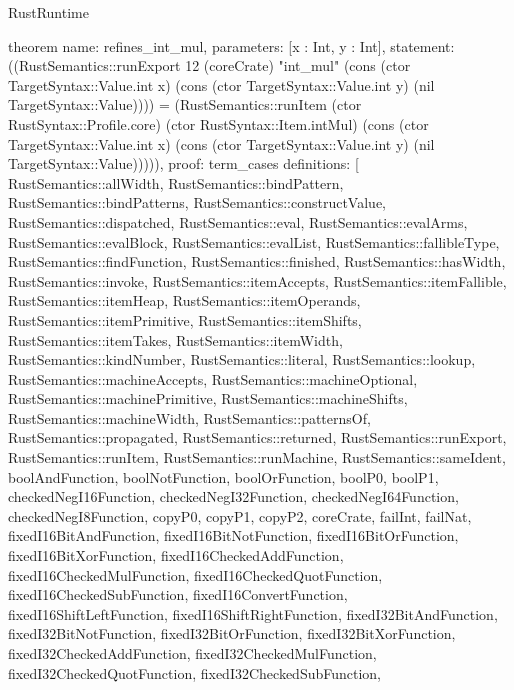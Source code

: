 \begin{lexlean}{RustRuntime}
\begin{semanticmodule}
theorem{
  name: refines_int_mul,
  parameters: [x : Int, y : Int],
  statement: ((RustSemantics::runExport 12 (coreCrate) "int_mul" (cons (ctor TargetSyntax::Value.int x) (cons (ctor TargetSyntax::Value.int y) (nil TargetSyntax::Value)))) = (RustSemantics::runItem (ctor RustSyntax::Profile.core) (ctor RustSyntax::Item.intMul) (cons (ctor TargetSyntax::Value.int x) (cons (ctor TargetSyntax::Value.int y) (nil TargetSyntax::Value))))),
  proof: term_cases{
    definitions: [
      RustSemantics::allWidth,
      RustSemantics::bindPattern,
      RustSemantics::bindPatterns,
      RustSemantics::constructValue,
      RustSemantics::dispatched,
      RustSemantics::eval,
      RustSemantics::evalArms,
      RustSemantics::evalBlock,
      RustSemantics::evalList,
      RustSemantics::fallibleType,
      RustSemantics::findFunction,
      RustSemantics::finished,
      RustSemantics::hasWidth,
      RustSemantics::invoke,
      RustSemantics::itemAccepts,
      RustSemantics::itemFallible,
      RustSemantics::itemHeap,
      RustSemantics::itemOperands,
      RustSemantics::itemPrimitive,
      RustSemantics::itemShifts,
      RustSemantics::itemTakes,
      RustSemantics::itemWidth,
      RustSemantics::kindNumber,
      RustSemantics::literal,
      RustSemantics::lookup,
      RustSemantics::machineAccepts,
      RustSemantics::machineOptional,
      RustSemantics::machinePrimitive,
      RustSemantics::machineShifts,
      RustSemantics::machineWidth,
      RustSemantics::patternsOf,
      RustSemantics::propagated,
      RustSemantics::returned,
      RustSemantics::runExport,
      RustSemantics::runItem,
      RustSemantics::runMachine,
      RustSemantics::sameIdent,
      boolAndFunction,
      boolNotFunction,
      boolOrFunction,
      boolP0,
      boolP1,
      checkedNegI16Function,
      checkedNegI32Function,
      checkedNegI64Function,
      checkedNegI8Function,
      copyP0,
      copyP1,
      copyP2,
      coreCrate,
      failInt,
      failNat,
      fixedI16BitAndFunction,
      fixedI16BitNotFunction,
      fixedI16BitOrFunction,
      fixedI16BitXorFunction,
      fixedI16CheckedAddFunction,
      fixedI16CheckedMulFunction,
      fixedI16CheckedQuotFunction,
      fixedI16CheckedSubFunction,
      fixedI16ConvertFunction,
      fixedI16ShiftLeftFunction,
      fixedI16ShiftRightFunction,
      fixedI32BitAndFunction,
      fixedI32BitNotFunction,
      fixedI32BitOrFunction,
      fixedI32BitXorFunction,
      fixedI32CheckedAddFunction,
      fixedI32CheckedMulFunction,
      fixedI32CheckedQuotFunction,
      fixedI32CheckedSubFunction,
}}
\end{semanticmodule}
\end{lexlean}
